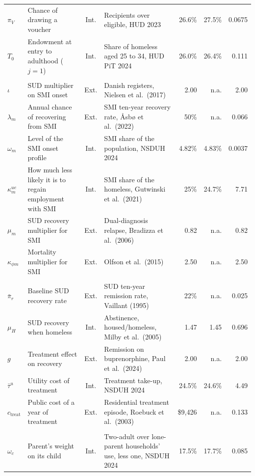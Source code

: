 \begin{table}[htbp]
{\begin{tabular}{@{}llclrrr@{}}
$\pi_V$ & Chance of drawing a voucher & Int. & Recipients over eligible, HUD 2023 & 26.6\% & 27.5\% & 0.0675 \\
$T_0$ & Endowment at entry to adulthood ($j=1$) & Int. & Share of homeless aged 25 to 34, HUD PiT 2024 & 26.0\% & 26.4\% & 0.111 \\
\addlinespace
\multicolumn{7}{@{}l}{\emph{Block 3: SMI chain}} \\
$\iota$ & SUD multiplier on SMI onset & Ext. & Danish registers, Nielsen et al.\ (2017) & 2.00 & n.a. & 2.00 \\
$\lambda_m$ & Annual chance of recovering from SMI & Ext. & SMI ten-year recovery rate, {\AA}sb{\o} et al.\ (2022) & 50\% & n.a. & 0.066 \\
$\omega_m$ & Level of the SMI onset profile & Int. & SMI share of the population, NSDUH 2024 & 4.82\% & 4.83\% & 0.0037 \\
$\kappa^{ue}_{m}$ & How much less likely it is to regain employment with SMI & Int. & SMI share of the homeless, Gutwinski et al.\ (2021) & 25\% & 24.7\% & 7.71 \\
$\mu_m$ & SUD recovery multiplier for SMI & Ext. & Dual-diagnosis relapse, Bradizza et al.\ (2006) & 0.82 & n.a. & 0.82 \\
$\kappa_{\phi m}$ & Mortality multiplier for SMI & Ext. & Olfson et al.\ (2015) & 2.50 & n.a. & 2.50 \\
\addlinespace
\multicolumn{7}{@{}l}{\emph{Block 4: Recovery and treatment}} \\
$\bar\pi_r$ & Baseline SUD recovery rate & Ext. & SUD ten-year remission rate, Vaillant (1995) & 22\% & n.a. & 0.025 \\
$\mu_H$ & SUD recovery when homeless & Int. & Abstinence, housed/homeless, Milby et al.\ (2005) & 1.47 & 1.45 & 0.696 \\
$g$ & Treatment effect on recovery & Ext. & Remission on buprenorphine, Paul et al.\ (2024) & 2.00 & n.a. & 2.00 \\
$\bar\tau^{u}$ & Utility cost of treatment & Int. & Treatment take-up, NSDUH 2024 & 24.5\% & 24.6\% & 4.49 \\
$c_{\text{treat}}$ & Public cost of a year of treatment & Ext. & Residential treatment episode, Roebuck et al.\ (2003) & \$9,426 & n.a. & 0.133 \\
\addlinespace
\multicolumn{7}{@{}l}{\emph{Block 5: Externalities}} \\
$\omega_c$ & Parent's weight on its child & Int. & Two-adult over lone-parent households' use, less one, NSDUH 2024 & 17.5\% & 17.7\% & 0.085 \\

\end{tabular}}
\end{table}
